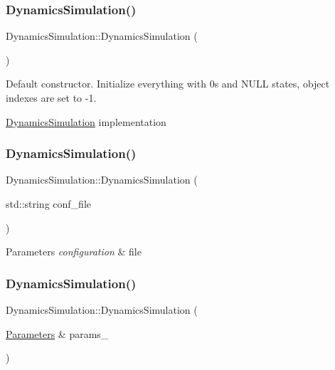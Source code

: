 \subsubsection{\texorpdfstring{Dynamics\+Simulation()}{DynamicsSimulation()}\hspace{0.1cm}{\footnotesize\ttfamily [1/3]}}
{\footnotesize\ttfamily Dynamics\+Simulation\+::\+Dynamics\+Simulation (\begin{DoxyParamCaption}{ }\end{DoxyParamCaption})}



Default constructor. Initialize everything with 0\textquotesingle{}s and N\+U\+LL states, object indexes are set to -\/1. 

\hyperlink{class_dynamics_simulation}{Dynamics\+Simulation} implementation \mbox{\label{class_dynamics_simulation_aa603b5ba682b1b37cc96dd8be113cb52}} 
\subsubsection{\texorpdfstring{Dynamics\+Simulation()}{DynamicsSimulation()}\hspace{0.1cm}{\footnotesize\ttfamily [2/3]}}
{\footnotesize\ttfamily Dynamics\+Simulation\+::\+Dynamics\+Simulation (\begin{DoxyParamCaption}\item[{std\+::string}]{conf\+\_\+file }\end{DoxyParamCaption})}


\begin{DoxyParams}{Parameters}
{\em configuration} & file \\
\hline
\end{DoxyParams}
\mbox{\label{class_dynamics_simulation_a8fd2ec6f3640bff79e4b1ad960bbda5b}} 
\subsubsection{\texorpdfstring{Dynamics\+Simulation()}{DynamicsSimulation()}\hspace{0.1cm}{\footnotesize\ttfamily [3/3]}}
{\footnotesize\ttfamily Dynamics\+Simulation\+::\+Dynamics\+Simulation (\begin{DoxyParamCaption}\item[{\hyperlink{class_parameters}{Parameters} \&}]{params\+\_\+ }\end{DoxyParamCaption})}


